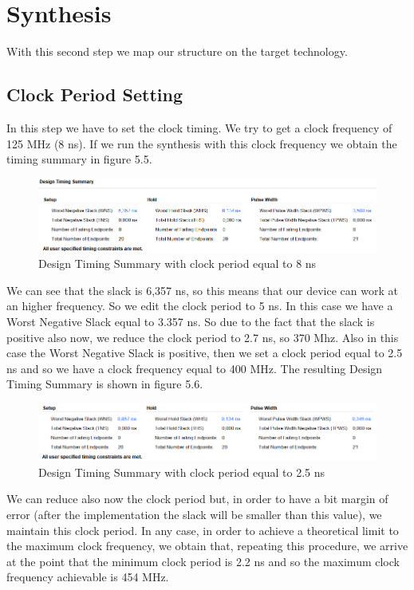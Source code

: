 \documentclass[a4paper]{report}
\begin{document}
\section{Synthesis}
With this second step we map our structure on the target technology.
\subsection{Clock Period Setting}
In this step we have to set the clock timing. We try to get a clock frequency of 125 MHz (8 ns). If we run the synthesis with this clock frequency we obtain the timing summary in figure 5.5.
\begin{figure}[htpb]
	\centering
	\includegraphics[scale=0.6]{img/vivado/timing_summary1.png}
	\caption{Design Timing Summary with clock period equal to 8 ns}
\end{figure}


\noindent We can see that the slack is 6,357 ns, so this means that our device can work at an higher frequency. So we edit the clock period to 5 ns. In this case we have a Worst Negative Slack equal to 3.357 ns.
\noindent So due to the fact that the slack is positive also now, we reduce the clock period to 2.7 ns, so 370 Mhz. Also in this case the Worst Negative Slack is positive, then we set a clock period equal to 2.5 ns and so we have a clock frequency equal to 400 MHz. The resulting Design Timing Summary is shown in figure 5.6.
\begin{figure}[htpb]
	\centering
	\includegraphics[scale=0.7]{img/vivado/timing_summary3.png}
	\caption{Design Timing Summary with clock period equal to 2.5 ns}
\end{figure}

\noindent We can reduce also now the clock period but, in order to have a bit margin of error (after the implementation the slack will be smaller than this value), we maintain this clock period. In any case, in order to achieve a theoretical limit to the maximum clock frequency, we obtain that, repeating this procedure, we arrive at the point that the minimum clock period is 2.2 ns and so the maximum clock frequency achievable is 454 MHz.
\end{document}
